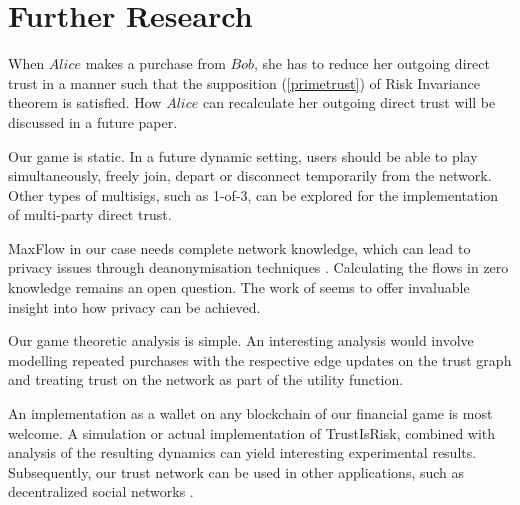 \section{Further Research}

    When $Alice$ makes a purchase from $Bob$, she has to reduce her outgoing direct trust in a manner such that the
    supposition (\ref{primetrust}) of Risk Invariance theorem is satisfied. How $Alice$ can recalculate her outgoing
    direct trust will be discussed in a future paper.

    Our game is static. In a future dynamic setting, users should be able to play simultaneously, freely join, depart or
    disconnect temporarily from the network. Other types of multisigs, such as 1-of-3, can be explored for the
    implementation of multi-party direct trust.

    MaxFlow in our case needs complete network knowledge, which can lead to privacy issues through deanonymisation
    techniques \cite{deanonymisation}. Calculating the flows in zero knowledge remains an open question. The work of
    \cite{silentwhispers} seems to offer invaluable insight into how privacy can be achieved.

    Our game theoretic analysis is simple. An interesting analysis would involve modelling repeated purchases with the
    respective edge updates on the trust graph and treating trust on the network as part of the utility function.

    An implementation as a wallet on any blockchain of our financial game is most welcome. A simulation or actual
    implementation of TrustIsRisk, combined with analysis of the resulting dynamics can yield interesting experimental
    results. Subsequently, our trust network can be used in other applications, such as decentralized social networks
    \cite{synereo}.

